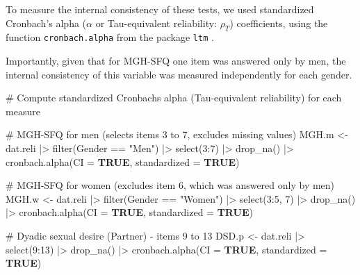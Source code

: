\documentclass[
  bookmarksnumbered]{article}
\newenvironment{Shaded}{\begin{snugshade}}{\end{snugshade}}
\newcommand{\AttributeTok}[1]{\textcolor[rgb]{0.80,0.80,0.80}{#1}}
\newcommand{\CommentTok}[1]{\textcolor[rgb]{0.50,0.62,0.50}{#1}}
\newcommand{\ConstantTok}[1]{\textcolor[rgb]{0.86,0.64,0.64}{\textbf{#1}}}
\newcommand{\DecValTok}[1]{\textcolor[rgb]{0.86,0.86,0.80}{#1}}
\newcommand{\FunctionTok}[1]{\textcolor[rgb]{0.94,0.94,0.56}{#1}}
\newcommand{\NormalTok}[1]{\textcolor[rgb]{0.80,0.80,0.80}{#1}}
\newcommand{\OtherTok}[1]{\textcolor[rgb]{0.94,0.94,0.56}{#1}}
\newcommand{\SpecialCharTok}[1]{\textcolor[rgb]{0.86,0.64,0.64}{#1}}
\newcommand{\StringTok}[1]{\textcolor[rgb]{0.80,0.58,0.58}{#1}}
\begin{document}
To measure the internal consistency of these tests, we used standardized Cronbach's alpha (\(\alpha\) or Tau-equivalent reliability: \(\rho_{T}\)) coefficients, using the function \texttt{cronbach.alpha} from the package \texttt{ltm} \autocite{LtmPackageLatent2006}.

Importantly, given that for MGH-SFQ one item was answered only by men, the internal consistency of this variable was measured independently for each gender.

\begin{Shaded}
\begin{Highlighting}[]
\CommentTok{\# Compute standardized Cronbach\textquotesingle{}s alpha (Tau{-}equivalent reliability) for each measure}

\CommentTok{\# MGH{-}SFQ for men (selects items 3 to 7, excludes missing values)}
\NormalTok{MGH.m }\OtherTok{\textless{}{-}}\NormalTok{ dat.reli }\SpecialCharTok{|\textgreater{}}
  \FunctionTok{filter}\NormalTok{(Gender }\SpecialCharTok{==} \StringTok{"Men"}\NormalTok{) }\SpecialCharTok{|\textgreater{}}
  \FunctionTok{select}\NormalTok{(}\DecValTok{3}\SpecialCharTok{:}\DecValTok{7}\NormalTok{) }\SpecialCharTok{|\textgreater{}}
  \FunctionTok{drop\_na}\NormalTok{() }\SpecialCharTok{|\textgreater{}}
  \FunctionTok{cronbach.alpha}\NormalTok{(}\AttributeTok{CI =} \ConstantTok{TRUE}\NormalTok{, }\AttributeTok{standardized =} \ConstantTok{TRUE}\NormalTok{)}

\CommentTok{\# MGH{-}SFQ for women (excludes item 6, which was answered only by men)}
\NormalTok{MGH.w }\OtherTok{\textless{}{-}}\NormalTok{ dat.reli }\SpecialCharTok{|\textgreater{}}
  \FunctionTok{filter}\NormalTok{(Gender }\SpecialCharTok{==} \StringTok{"Women"}\NormalTok{) }\SpecialCharTok{|\textgreater{}}
  \FunctionTok{select}\NormalTok{(}\DecValTok{3}\SpecialCharTok{:}\DecValTok{5}\NormalTok{, }\DecValTok{7}\NormalTok{) }\SpecialCharTok{|\textgreater{}}
  \FunctionTok{drop\_na}\NormalTok{() }\SpecialCharTok{|\textgreater{}}
  \FunctionTok{cronbach.alpha}\NormalTok{(}\AttributeTok{CI =} \ConstantTok{TRUE}\NormalTok{, }\AttributeTok{standardized =} \ConstantTok{TRUE}\NormalTok{)}

\CommentTok{\# Dyadic sexual desire (Partner) {-} items 9 to 13}
\NormalTok{DSD.p }\OtherTok{\textless{}{-}}\NormalTok{ dat.reli }\SpecialCharTok{|\textgreater{}}
  \FunctionTok{select}\NormalTok{(}\DecValTok{9}\SpecialCharTok{:}\DecValTok{13}\NormalTok{) }\SpecialCharTok{|\textgreater{}}
  \FunctionTok{drop\_na}\NormalTok{() }\SpecialCharTok{|\textgreater{}}
  \FunctionTok{cronbach.alpha}\NormalTok{(}\AttributeTok{CI =} \ConstantTok{TRUE}\NormalTok{, }\AttributeTok{standardized =} \ConstantTok{TRUE}\NormalTok{)}


\end{Highlighting}
\end{Shaded}
\end{document}
